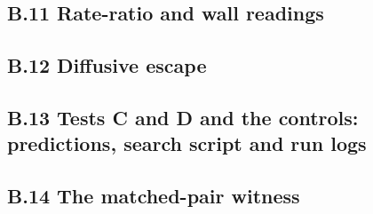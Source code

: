 \documentclass[11pt]{article}
\begin{document}
\subsection*{B.11 Rate-ratio and wall readings}




\subsection*{B.12 Diffusive escape}


\subsection*{B.13 Tests C and D and the controls: predictions, search script and run logs}








\subsection*{B.14 The matched-pair witness}








\end{document}
